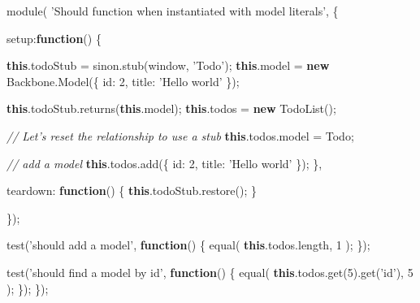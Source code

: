 \documentclass[9pt]{book}
\newenvironment{Shaded}{}{}
\newcommand{\KeywordTok}[1]{\textcolor[rgb]{0.00,0.44,0.13}{\textbf{{#1}}}}
\newcommand{\DataTypeTok}[1]{\textcolor[rgb]{0.56,0.13,0.00}{{#1}}}
\newcommand{\DecValTok}[1]{\textcolor[rgb]{0.25,0.63,0.44}{{#1}}}
\newcommand{\StringTok}[1]{\textcolor[rgb]{0.25,0.44,0.63}{{#1}}}
\newcommand{\CommentTok}[1]{\textcolor[rgb]{0.38,0.63,0.69}{\textit{{#1}}}}
\newcommand{\OtherTok}[1]{\textcolor[rgb]{0.00,0.44,0.13}{{#1}}}
\newcommand{\FunctionTok}[1]{\textcolor[rgb]{0.02,0.16,0.49}{{#1}}}
\newcommand{\NormalTok}[1]{{#1}}
\begin{document}
\begin{Shaded}
\begin{Highlighting}[]
\FunctionTok{module}\NormalTok{( }\StringTok{'Should function when instantiated with model literals'}\NormalTok{, \{}

  \DataTypeTok{setup}\NormalTok{:}\KeywordTok{function}\NormalTok{() \{}

    \KeywordTok{this}\NormalTok{.}\FunctionTok{todoStub} \NormalTok{= }\OtherTok{sinon}\NormalTok{.}\FunctionTok{stub}\NormalTok{(window, }\StringTok{'Todo'}\NormalTok{);}
    \KeywordTok{this}\NormalTok{.}\FunctionTok{model} \NormalTok{= }\KeywordTok{new} \OtherTok{Backbone}\NormalTok{.}\FunctionTok{Model}\NormalTok{(\{}
      \DataTypeTok{id}\NormalTok{: }\DecValTok{2}\NormalTok{,}
      \DataTypeTok{title}\NormalTok{: }\StringTok{'Hello world'}
    \NormalTok{\});}

    \KeywordTok{this}\NormalTok{.}\OtherTok{todoStub}\NormalTok{.}\FunctionTok{returns}\NormalTok{(}\KeywordTok{this}\NormalTok{.}\FunctionTok{model}\NormalTok{);}
    \KeywordTok{this}\NormalTok{.}\FunctionTok{todos} \NormalTok{= }\KeywordTok{new} \FunctionTok{TodoList}\NormalTok{();}

    \CommentTok{// Let's reset the relationship to use a stub}
    \KeywordTok{this}\NormalTok{.}\OtherTok{todos}\NormalTok{.}\FunctionTok{model} \NormalTok{= Todo;}
    
    \CommentTok{// add a model}
    \KeywordTok{this}\NormalTok{.}\OtherTok{todos}\NormalTok{.}\FunctionTok{add}\NormalTok{(\{}
      \DataTypeTok{id}\NormalTok{: }\DecValTok{2}\NormalTok{,}
      \DataTypeTok{title}\NormalTok{: }\StringTok{'Hello world'}
    \NormalTok{\});}
  \NormalTok{\},}

  \DataTypeTok{teardown}\NormalTok{: }\KeywordTok{function}\NormalTok{() \{}
    \KeywordTok{this}\NormalTok{.}\OtherTok{todoStub}\NormalTok{.}\FunctionTok{restore}\NormalTok{();}
  \NormalTok{\}}

\NormalTok{\});}

\FunctionTok{test}\NormalTok{(}\StringTok{'should add a model'}\NormalTok{, }\KeywordTok{function}\NormalTok{() \{}
    \FunctionTok{equal}\NormalTok{( }\KeywordTok{this}\NormalTok{.}\OtherTok{todos}\NormalTok{.}\FunctionTok{length}\NormalTok{, }\DecValTok{1} \NormalTok{);}
\NormalTok{\});}

\FunctionTok{test}\NormalTok{(}\StringTok{'should find a model by id'}\NormalTok{, }\KeywordTok{function}\NormalTok{() \{}
    \FunctionTok{equal}\NormalTok{( }\KeywordTok{this}\NormalTok{.}\OtherTok{todos}\NormalTok{.}\FunctionTok{get}\NormalTok{(}\DecValTok{5}\NormalTok{).}\FunctionTok{get}\NormalTok{(}\StringTok{'id'}\NormalTok{), }\DecValTok{5} \NormalTok{);}
  \NormalTok{\});}
\NormalTok{\});}
\end{Highlighting}
\end{Shaded}
\end{document}
